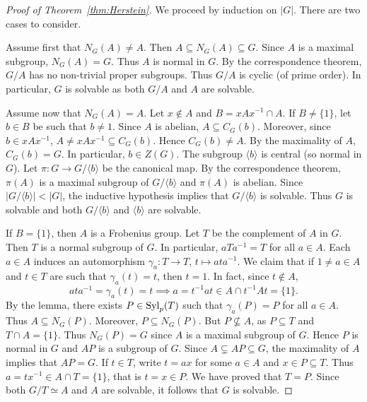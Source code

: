 \begin{proof}[Proof of Theorem~\ref{thm:Herstein}]
    We proceed by induction on $|G|$. There are two cases
    to consider. 

    Assume first that $N_G(A)\ne A$. Then $A\subseteq N_G(A)\subseteq G$. Since $A$ is a maximal subgroup, $N_G(A)=G$. Thus $A$ 
    is normal in $G$. By the correspondence theorem, $G/A$ has no non-trivial proper subgroups. Thus $G/A$ is cyclic (of prime
    order). In particular, $G$ is solvable as both 
    $G/A$ and $A$ are solvable. 

    Assume now that $N_G(A)=A$. Let $x\not\in A$ and $B=xAx^{-1}\cap A$. If $B\ne\{1\}$, let $b\in B$ be such that $b\ne 1$. 
    Since $A$ is abelian, $A\subseteq C_G(b)$. Moreover, since
    $b\in xAx^{-1}$, $A\ne xAx^{-1}\subseteq C_G(b)$. 
    Hence $C_G(b)\ne A$. By the maximality of $A$, $C_G(b)=G$. In particular, $b\in Z(G)$. The subgroup $\langle b\rangle$ 
    is central (so normal in $G$). Let $\pi\colon G\to G/\langle b\rangle$ be the canonical map. By the correspondence 
    theorem, $\pi(A)$ is a maximal subgroup of $G/\langle b\rangle$ and 
    $\pi(A)$ is abelian. Since $|G/\langle b\rangle|<|G|$, the inductive hypothesis implies that $G/\langle b\rangle$ is solvable. Thus $G$ is solvable and both 
    $G/\langle b\rangle$ and $\langle b\rangle$ are solvable. 

    If $B=\{1\}$, then $A$ is a Frobenius group. Let $T$ be 
    the complement of $A$ in $G$. Then $T$ is a normal subgroup 
    of $G$. In particular, $aTa^{-1}=T$ for all $a\in A$. 
    Each $a\in A$ induces an automorphism 
    $\gamma_a\colon T\to T$, $t\mapsto ata^{-1}$. We claim that 
    if $1\ne a\in A$ and $t\in T$ are such that 
    $\gamma_a(t)=t$, then $t=1$. In fact, since $t\not\in A$, 
    \[
    ata^{-1}=\gamma_a(t)=t\implies 
    a=t^{-1}at\in A\cap t^{-1}At=\{1\}.
    \]
    By the lemma, there exists $P\in\mathrm{Syl}_p(T)$ 
    such that $\gamma_a(P)=P$ for all $a\in A$. Thus 
    $A\subseteq N_G(P)$. Moreover, $P\subseteq N_G(P)$. But $P\not\subseteq A$, as $P\subseteq T$ and $T\cap A=\{1\}$. Thus 
    $N_G(P)=G$ since $A$ is a maximal subgroup of $G$. Hence 
    $P$ is normal in $G$ and $AP$ is a subgroup of $G$. 
    Since $A\subsetneq AP\subseteq G$, the maximality of $A$ 
    implies that $AP=G$. If $t\in T$, write
    $t=ax$ for some $a\in A$ and $x\in P\subseteq T$. Thus 
    $a=tx^{-1}\in A\cap T=\{1\}$, that is $t=x\in P$. We have proved
    that $T=P$. Since both $G/T\simeq A$ and $A$ are solvable, it follows that $G$ is solvable. 
\end{proof}

